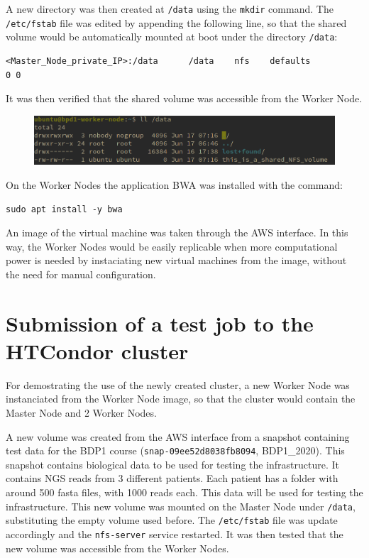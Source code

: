 \documentclass{article}
\begin{document}
A new directory was then created at \texttt{/data} using the \texttt{mkdir} command.
The \texttt{/etc/fstab} file was edited by appending the following line, so that the shared volume would be automatically mounted at boot under the directory \texttt{/data}:

\begin{lstlisting}
<Master_Node_private_IP>:/data      /data    nfs    defaults                0 0
\end{lstlisting}

It was then verified that the shared volume was accessible from the Worker Node.

\begin{figure}[!h]
	\center
	\includegraphics[width=\textwidth]{./images/nfs_works.png}
\end{figure}

On the Worker Nodes the application BWA was installed with the command:

\begin{lstlisting}
sudo apt install -y bwa
\end{lstlisting}

An image of the virtual machine was taken through the AWS interface.
In this way, the Worker Nodes would be easily replicable when more computational power is needed by instaciating new virtual machines from the image, without the need for manual configuration.

\section{Submission of a test job to the HTCondor cluster}
For demostrating the use of the newly created cluster, a new Worker Node was instanciated from the Worker Node image, so that the cluster would contain the Master Node and 2 Worker Nodes.

A new volume was created from the AWS interface from a snapshot containing test data for the BDP1 course (\texttt{snap-09ee52d8038fb8094}, BDP1\_2020).
This snapshot contains biological data to be used for testing the infrastructure.
It contains NGS reads from 3 different patients.
Each patient has a folder with around 500 fasta files, with 1000 reads each.
This data will be used for testing the infrastructure.
This new volume was mounted on the Master Node under \texttt{/data}, substituting the empty volume used before.
The \texttt{/etc/fstab} file was update accordingly and the \texttt{nfs-server} service restarted.
It was then tested that the new volume was accessible from the Worker Nodes.
\end{document}
